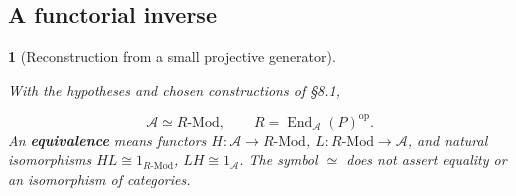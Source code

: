 \documentclass[11pt,a4paper]{article}
\newcommand{\mathheading}{}
\theoremstyle{plain}
\newtheorem*{plainstatement}{\mathheading}
\theoremstyle{definition}
\newenvironment{mathstatement}[3]{\renewcommand{\mathheading}{#1 #2}\begin{plainstatement}[#3]}{\end{plainstatement}}
\begin{document}
\subsection{A functorial inverse}
\label{equivalence}

\begin{mathstatement}{Theorem}{8.6}{Reconstruction from a small projective generator}
\label{env-8-6}

With the hypotheses and chosen constructions of \S{}8.1,

 \[\boxed{\mathcal A\simeq R\text{-Mod},\qquad R=\operatorname{End}_{\mathcal A}(P)^{\mathrm{op}}.}\] 
An \textbf{equivalence} means functors \(H:\mathcal A\to R\text{-Mod}\), \(L:R\text{-Mod}\to\mathcal A\), and natural isomorphisms \(HL\cong1_{R\text{-Mod}}\), \(LH\cong1_{\mathcal A}\). The symbol \(\simeq\) does not assert equality or an isomorphism of categories.


\par{}\par

\end{mathstatement}
 
\end{document}
